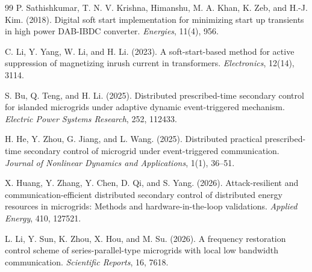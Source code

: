 \documentclass[]{interact}
\theoremstyle{plain}%
\theoremstyle{definition}
\theoremstyle{remark}
\begin{document}
\begin{thebibliography}{99}
P. Sathishkumar, T. N. V. Krishna, Himanshu, M. A. Khan, K. Zeb, and H.-J. Kim. (2018). Digital soft start implementation for minimizing start up transients in high power DAB-IBDC converter. \emph{Energies}, 11(4), 956.

C. Li, Y. Yang, W. Li, and H. Li. (2023). A soft-start-based method for active suppression of magnetizing inrush current in transformers. \emph{Electronics}, 12(14), 3114.

S. Bu, Q. Teng, and H. Li. (2025). Distributed prescribed-time secondary control for islanded microgrids under adaptive dynamic event-triggered mechanism. \emph{Electric Power Systems Research}, 252, 112433.

H. He, Y. Zhou, G. Jiang, and L. Wang. (2025). Distributed practical prescribed-time secondary control of microgrid under event-triggered communication. \emph{Journal of Nonlinear Dynamics and Applications}, 1(1), 36–51.

X. Huang, Y. Zhang, Y. Chen, D. Qi, and S. Yang. (2026). Attack-resilient and communication-efficient distributed secondary control of distributed energy resources in microgrids: Methods and hardware-in-the-loop validations. \emph{Applied Energy}, 410, 127521.

L. Li, Y. Sun, K. Zhou, X. Hou, and M. Su. (2026). A frequency restoration control scheme of series-parallel-type microgrids with local low bandwidth communication. \emph{Scientific Reports}, 16, 7618.

\end{thebibliography}
\end{document}

